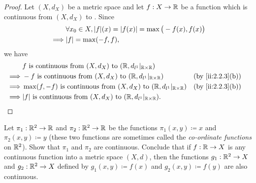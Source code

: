 \begin{proof}
  Let \((X, d_X)\) be a metric space and let \(f : X \to \mathbb{R}\) be a function which is continuous from \((X, d_X)\) to \(\).
  Since
  \begin{align*}
             & \forall x_0 \in X, \abs{f}(x) = \abs{f(x)} = \max\big(-f(x), f(x)\big) \\
    \implies & \abs{f} = \max(-f, f),
  \end{align*}
  we have
  \begin{align*}
             & f \text{ is continuous from } (X, d_X) \text{ to } (\R, d_{l^1}|_{\R \times \R})                                 \\
    \implies & -f \text{ is continuous from } (X, d_X) \text{ to } (\R, d_{l^1}|_{\R \times \R})          &  & \by{ii:2.2.3}[b] \\
    \implies & \max(f, -f) \text{ is continuous from } (X, d_X) \text{ to } (\R, d_{l^1}|_{\R \times \R}) &  & \by{ii:2.2.3}[b] \\
    \implies & \abs{f} \text{ is continuous from } (X, d_X) \text{ to } (\R, d_{l^1}|_{\R \times \R}).
  \end{align*}
\end{proof}

\begin{ex}\label{ii:ex:2.2.4}
  Let \(\pi_1 : \mathbb{R}^2 \to \mathbb{R}\) and \(\pi_2 : \mathbb{R}^2 \to \mathbb{R}\) be the functions \(\pi_1(x, y) \coloneqq x\) and \(\pi_2(x, y) \coloneqq y\) (these two functions are sometimes called the \emph{co-ordinate functions} on \(\mathbb{R}^2\)).
  Show that \(\pi_1\) and \(\pi_2\) are continuous.
  Conclude that if \(f : \mathbb{R} \to X\) is any continuous function into a metric space \((X, d)\), then the functions \(g_1 : \mathbb{R}^2 \to X\) and \(g_2 : \mathbb{R}^2 \to X\) defined by \(g_1(x, y) \coloneqq f(x)\) and \(g_2(x, y) \coloneqq f(y)\) are also continuous.
\end{ex}

